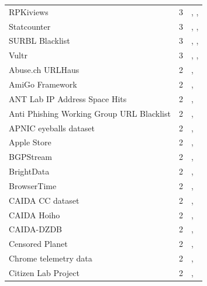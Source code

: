 \documentclass[11pt,a4paper]{article}
\begin{document}
\begin{longtable}{@{}p{} p{}p{}@{}}
RPKiviews  & 3 & \cite{10.1145/3730567.3764485}, \cite{10.1145/3730567.3764452}, \cite{10.1007/978-3-031-28486-1_18} \\
Statcounter & 3 & \cite{10.1145/3618257.3624842}, \cite{10.1145/3777912.3839824}, \cite{10.1145/3777912.3839815} \\
SURBL Blacklist  & 3 & \cite{10.1145/3487552.3487857}, \cite{10.1007/978-3-030-98785-5_2}, \cite{10.1007/978-3-031-56249-5_9} \\
Vultr & 3 & \cite{10.1145/3730567.3764495}, \cite{10.1007/978-3-031-85960-1_16}, \cite{10.1145/3777912.3809144} \\
Abuse.ch URLHaus  & 2 & \cite{10.1145/3487552.3487857}, \cite{10.1007/978-3-031-56249-5_9} \\
AmiGo Framework  & 2 & \cite{10.1145/3730567.3764491}, \cite{10.1145/3517745.3561442} \\
ANT Lab IP Address Space Hits & 2 & \cite{10.1007/978-3-030-98785-5_9}, \cite{10.1007/978-3-032-18268-5_3} \\
Anti Phishing Working Group URL Blacklist  & 2 & \cite{10.1007/978-3-031-28486-1_24}, \cite{10.1007/978-3-031-56249-5_9} \\
APNIC eyeballs dataset & 2 & \cite{10.1145/3487552.3487822}, \cite{10.1145/3777912.3839831} \\
Apple Store & 2 & \cite{10.1007/978-3-031-56252-5_2}, \cite{10.1145/3777912.3839789} \\
BGPStream & 2 & \cite{10.1007/978-3-030-98785-5_20}, \cite{10.1145/3777912.3809145} \\
BrightData  & 2 & \cite{10.1145/3487552.3487849}, \cite{10.1007/978-3-031-85960-1_15} \\
BrowserTime  & 2 & \cite{10.1145/3517745.3561416}, \cite{10.1007/978-3-031-28486-1_1} \\
CAIDA CC dataset  & 2 & \cite{10.1145/3618257.3624812}, \cite{10.1145/3487552.3487825} \\
CAIDA Hoiho & 2 & \cite{10.1145/3777912.3839791}, \cite{10.1145/3777912.3839795} \\
CAIDA-DZDB  & 2 & \cite{10.1145/3517745.3561425}, \cite{10.1145/3487552.3487816} \\
Censored Planet  & 2 & \cite{10.1007/978-3-030-98785-5_23}, \cite{10.1007/978-3-030-98785-5_28} \\
Chrome telemetry data  & 2 & \cite{10.1145/3517745.3561418}, \cite{10.1145/3517745.3561444} \\
Citizen Lab Project  & 2 & \cite{10.1145/3618257.3624817}, \cite{10.1145/3487552.3487836} \\

\end{longtable}
\end{document}
